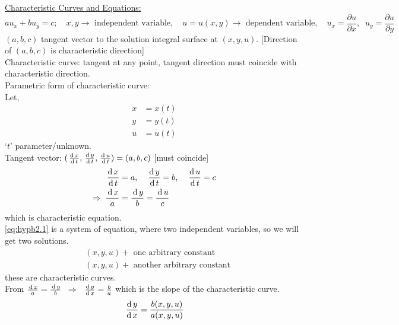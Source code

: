 \documentclass[../main-sheet.tex]{subfiles}
\begin{document}
\begin{note}
    \underline{Characteristic Curves and Equations:}
    \[
        au_x+bu_y=c;\quad x,y\to \text{ independent variable},\quad u=u(x,y)\to \text{ dependent variable},\quad u_x=\frac{\partial u}{\partial x},\;\;u_y=\frac{\partial u}{\partial y}
    \]
    \((a,b,c)\) tangent vector to the solution integral surface at \((x,y,u)\). [Direction of \((a,b,c)\) is characteristic direction]\\
    Characteristic curve: tangent at any point, tangent direction must coincide with characteristic direction.\\
    Parametric form of characteristic curve:\\
    Let,
    \begin{align*}
        x&=x(t)\\
        y&=y(t)\\
        u&=u(t)
    \end{align*}
    `\(t\)' parameter/unknown.\\
    Tangent vector: \((\,\frac{\mathrm{d}\,x}{\mathrm{d}\,t},\,\frac{\mathrm{d}\,y}{\mathrm{d}\,t},\,\frac{\mathrm{d}\,u}{\mathrm{d}\,t})=(a,b,c)\) [must coincide]
    \begin{align}
        &\,\frac{\mathrm{d}\,x}{\mathrm{d}\,t}=a,\quad \,\frac{\mathrm{d}\,y}{\mathrm{d}\,t}=b,\quad \,\frac{\mathrm{d}\,u}{\mathrm{d}\,t}=c\notag\\
        \Rightarrow\;\;&\frac{\,\mathrm{d}\, x}{a}=\frac{\,\mathrm{d}\, y}{b}=\frac{\,\mathrm{d}\, u}{c}\label{eq:hypb2.1}
    \end{align}
    which is characteristic equation.\\
    \eqref{eq:hypb2.1} is a system of equation, where two independent variables, so we will get two solutions.
    \begin{align*}
        &(x,y,u)+\text{ one arbitrary constant}\\
        &(x,y,u)+\text{ another arbitrary constant}
    \end{align*}
    these are characteristic curves.\\
    From \(\frac{\,\mathrm{d}\, x}{a}=\frac{\,\mathrm{d}\, y}{b}\;\;\Rightarrow\;\;\,\frac{\mathrm{d}\,y}{\mathrm{d}\,x}=\frac{b}{a}\) which is the slope of the characteristic curve.
    \[\,\frac{\mathrm{d}\,y}{\mathrm{d}\,x}=\frac{b(x,y,u)}{a(x,y,u)}\]
\end{note}
\end{document}
